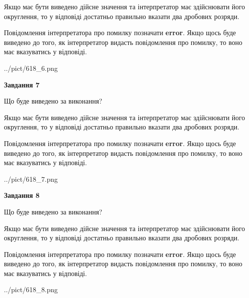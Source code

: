 \documentclass[12pt, ukrainian]{article}
\begin{document}
{\begin {Large}
Якщо має бути виведено дійсне значення та інтерпретатор має здійснювати його округлення, 
то у відповіді достатньо правильно вказати два дробових розряди.

Повідомлення інтерпретатора про помилку позначати \textbf{error}.
Якщо щось буде виведено до того, як інтерпретатор видасть повідомлення про помилку, 
то воно має вказуватись у відповіді. \par

\begin{center}
	{../pict/618_6.png}
\end{center}
\newpage

{\begin {center}\textbf{Завдання 7}\end {center}}\par
Що буде виведено за виконання? \par

Якщо має бути виведено дійсне значення та інтерпретатор має здійснювати його округлення, 
то у відповіді достатньо правильно вказати два дробових розряди.

Повідомлення інтерпретатора про помилку позначати \textbf{error}.
Якщо щось буде виведено до того, як інтерпретатор видасть повідомлення про помилку, 
то воно має вказуватись у відповіді. \par

\begin{center}
	{../pict/618_7.png}
\end{center}
\newpage

{\begin {center}\textbf{Завдання 8}\end {center}}\par
Що буде виведено за виконання? \par

Якщо має бути виведено дійсне значення та інтерпретатор має здійснювати його округлення, 
то у відповіді достатньо правильно вказати два дробових розряди.

Повідомлення інтерпретатора про помилку позначати \textbf{error}.
Якщо щось буде виведено до того, як інтерпретатор видасть повідомлення про помилку, 
то воно має вказуватись у відповіді. \par

\begin{center}
	{../pict/618_8.png}
\end{center}
\newpage


\end{Large}}
\end{document}
